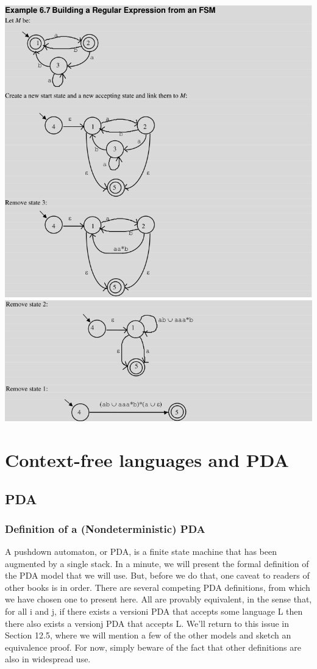\documentclass{article}
\begin{document}
\includegraphics[width=\textwidth]{img/fsmtoregex1.png}
\includegraphics[width=\textwidth]{img/fsmtoregex2.png}

\section{Context-free languages and PDA}

\subsection{PDA} 

\subsubsection{Definition of a (Nondeterministic) PDA }

A  pushdown automaton, or PDA, is a finite state machine that has been
augmented by a single stack.  In a minute, we will present the formal
definition of the PDA model that we will use.  But, before we do that, one
caveat to readers of other books is in order.  There are several competing PDA
definitions, from which we have chosen one to present here.  All are provably
equivalent, in the sense that, for all i and j, if there exists a versioni PDA
that accepts some language L then there also exists a versionj PDA that accepts
L.  We’ll return to this issue in Section 12.5, where we will mention a few of
the other models and sketch an equivalence proof.  For now, simply beware of
the fact that other definitions are also in widespread use. 
 
\end{document}

